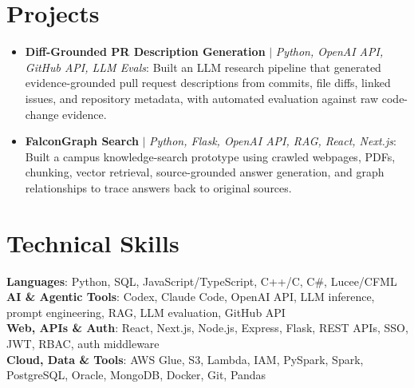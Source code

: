 \documentclass[letterpaper,11pt]{article}
\begin{document}
\section{Projects}
\begin{itemize}[leftmargin=0.15in, label={}, itemsep=-1pt, topsep=0pt, parsep=0pt]
  \item\small{\textbf{Diff-Grounded PR Description Generation} $|$ \emph{Python, OpenAI API, GitHub API, LLM Evals}: Built an LLM research pipeline that generated evidence-grounded pull request descriptions from commits, file diffs, linked issues, and repository metadata, with automated evaluation against raw code-change evidence.}
  \item\small{\textbf{FalconGraph Search} $|$ \emph{Python, Flask, OpenAI API, RAG, React, Next.js}: Built a campus knowledge-search prototype using crawled webpages, PDFs, chunking, vector retrieval, source-grounded answer generation, and graph relationships to trace answers back to original sources.}
\end{itemize}\vspace{-7pt}

\section{Technical Skills}
 \begin{itemize}[leftmargin=0.15in, label={}]
    \small{\item{
     \textbf{Languages}{: Python, SQL, JavaScript/TypeScript, C++/C, C\#, Lucee/CFML} \\
     \textbf{AI \& Agentic Tools}{: Codex, Claude Code, OpenAI API, LLM inference, prompt engineering, RAG, LLM evaluation, GitHub API} \\
     \textbf{Web, APIs \& Auth}{: React, Next.js, Node.js, Express, Flask, REST APIs, SSO, JWT, RBAC, auth middleware} \\
     \textbf{Cloud, Data \& Tools}{: AWS Glue, S3, Lambda, IAM, PySpark, Spark, PostgreSQL, Oracle, MongoDB, Docker, Git, Pandas}
    }}
 \end{itemize}
\end{document}
